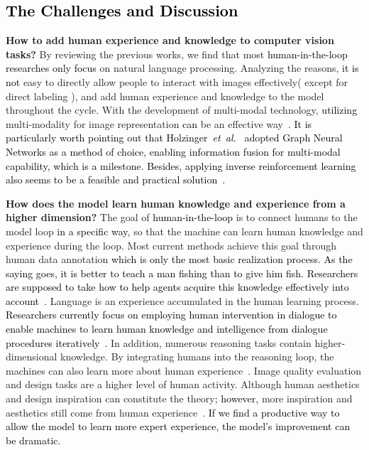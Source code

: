 \documentclass{article}
\newcommand\etal{\emph{et~al.}}
\newcommand{\p}[1]{\textcolor{black}{#1}}
\newcommand{\REO}[1]{\textcolor{black}{#1}}
\newcommand{\ZJH}[1]{\textcolor{black}{#1}}
\begin{document}
\REO{\subsection{The Challenges and Discussion}}
\noindent
\textbf{How to add human experience and knowledge to computer vision tasks? }
By reviewing the previous works, we find that most \REO{human-in-the-loop} \ZJH{researches only focus} on natural language processing. Analyzing the reasons, \p{it is not} easy to directly allow people to interact with images effectively( except for direct labeling ), and add human experience and knowledge to the model throughout the cycle.
With the development of multi-modal technology, \p{utilizing} multi-modality for image representation \ZJH{can} be an effective way~\cite{wiriyathammabhum2016computer}.
\REO{It is particularly worth pointing out that Holzinger~\etal~\cite{holzinger2021towards} \p{adopted} Graph Neural Networks as a method of choice, enabling information fusion for multi-modal capability, \ZJH{which is a milestone.}}
\p{Besides, applying inverse reinforcement learning also seems to be a feasible and practical solution~\cite{arora2021survey}.}


\noindent
\textbf{How does the model learn human knowledge and experience from a higher dimension? }
The goal of \REO{human-in-the-loop} is to connect humans to the model loop \p{in a specific way}, so that the machine can learn human knowledge and experience during the loop. Most current methods achieve this goal through human data annotation \ZJH{which is only the most basic realization process.} \p{As the saying goes, it is better to teach a man fishing than to give him fish. Researchers are supposed to take how to help agents acquire this knowledge effectively into account~\cite{doan2017human}.}
Language is an experience accumulated in the human learning process. \p{Researchers currently focus on employing human intervention in dialogue to enable machines to learn human knowledge and intelligence from dialogue procedures iteratively~\cite{li2016dialogue}.}
In addition, numerous reasoning tasks contain higher-dimensional knowledge. By integrating humans into the reasoning loop, the machines can also learn more about human experience~\cite{cranor2008framework}.
Image quality evaluation and design tasks are a higher level of human activity. Although human aesthetics and design inspiration can constitute the theory\ZJH{; however,} more inspiration and aesthetics still come from human experience~\cite{amirpourazarian2021quality}. \ZJH{\p{If we find a productive way to allow the model to learn more expert experience, the model's improvement can be dramatic.}}
\end{document}
